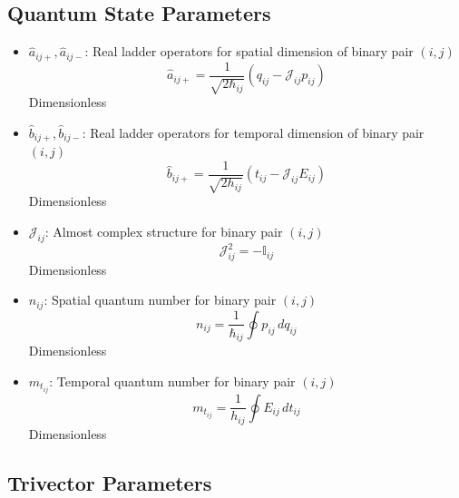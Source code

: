 \documentclass{article}
\begin{document}
\subsection{Quantum State Parameters}

\begin{itemize}
\item $\hat{a}_{ij+}, \hat{a}_{ij-}$: Real ladder operators for spatial dimension of binary pair $(i,j)$
    \begin{equation}
    \hat{a}_{ij+} = \frac{1}{\sqrt{2\hbar_{ij}}}(q_{ij} - \mathcal{J}_{ij} p_{ij})
    \end{equation}
    Dimensionless
    
\item $\hat{b}_{ij+}, \hat{b}_{ij-}$: Real ladder operators for temporal dimension of binary pair $(i,j)$
    \begin{equation}
    \hat{b}_{ij+} = \frac{1}{\sqrt{2h_{ij}}}(t_{ij} - \mathcal{J}_{ij} E_{ij})
    \end{equation}
    Dimensionless
    
\item $\mathcal{J}_{ij}$: Almost complex structure for binary pair $(i,j)$
    \begin{equation}
    \mathcal{J}_{ij}^2 = -\mathbb{I}_{ij}
    \end{equation}
    Dimensionless
    
\item $n_{ij}$: Spatial quantum number for binary pair $(i,j)$
    \begin{equation}
    n_{ij} = \frac{1}{\hbar_{ij}} \oint p_{ij} \, dq_{ij}
    \end{equation}
    Dimensionless
    
\item $m_{t_{ij}}$: Temporal quantum number for binary pair $(i,j)$
    \begin{equation}
    m_{t_{ij}} = \frac{1}{h_{ij}} \oint E_{ij} \, dt_{ij}
    \end{equation}
    Dimensionless
\end{itemize}

\subsection{Trivector Parameters}
\end{document}
